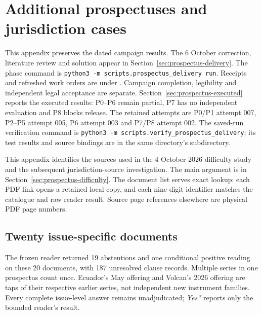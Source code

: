 \chapter{Additional prospectuses and jurisdiction cases}
\label{app:prospectus-difficulty}

This appendix preserves the dated campaign results. The 6 October correction,
literature review and solution appear in Section~\ref{sec:prospectus-delivery}.
The phase command is \texttt{python3 -m scripts.prospectus\_delivery run}.
Receipts and refreshed work orders are under
.
Campaign completion, legibility and independent legal acceptance are separate.
Section~\ref{sec:prospectus-executed} reports the executed results: P0--P6
remain partial, P7 has no independent evaluation and P8 blocks release.
The retained attempts are P0/P1 attempt 007, P2--P5 attempt 005,
P6 attempt 003 and P7/P8 attempt 002.
The saved-run verification command is
\texttt{python3 -m scripts.verify\_prospectus\_delivery};
its test results and source bindings are in the same directory's
 subdirectory.

This appendix identifies the sources used in the 4 October 2026 difficulty
study and the subsequent jurisdiction-source investigation. The main
argument is in Section~\ref{sec:prospectus-difficulty}. The document list
serves exact lookup: each PDF link opens a retained local copy, and each
nine-digit identifier matches the catalogue and raw reader result. Source
page references elsewhere are physical PDF page numbers.

\section{Twenty issue-specific documents}

The frozen reader returned 19 abstentions and one conditional positive
reading on these 20 documents, with 187 unresolved clause records. Multiple
series in one prospectus count once. Ecuador's May offering and Volcan's
2026 offering are taps of their respective earlier series, not independent
new instrument families. Every complete issue-level answer remains
unadjudicated; \emph{Yes*} reports only the bounded reader's result.

